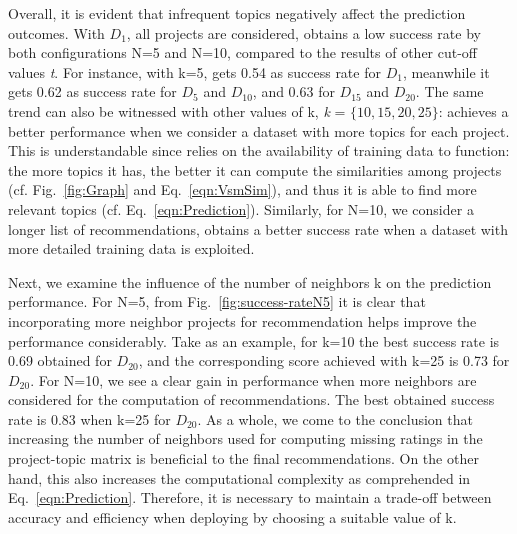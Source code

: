 Overall, it is evident that infrequent topics negatively affect the prediction outcomes. With $D_{1}$, \ie all projects are considered, \TF obtains a low success rate by both configurations N=5 and N=10, compared to the results of other cut-off values \emph{t}. For instance, with k=5, \TFa gets 0.54 as success rate for $D_{1}$, meanwhile it gets 0.62 as success rate for $D_{5}$ and $D_{10}$, and 0.63 for $D_{15}$ and $D_{20}$. The same trend can also be witnessed with other values of k, \ie \emph{k} = $\{10, 15, 20, 25\}$: \TFa achieves a better performance when we consider a dataset with more topics for each project. This is understandable since \TFa relies on the availability of training data to function: the more topics it has, the better it can compute the similarities among projects (cf. Fig.~\ref{fig:Graph} and Eq.~\ref{eqn:VsmSim}), and thus it is able to find more relevant topics (cf. Eq.~\ref{eqn:Prediction}). Similarly, for N=10, \ie we consider a longer list of recommendations, \TFa obtains a better success rate when a dataset with more detailed training data is exploited. 




Next, we examine the influence of the number of neighbors k on the prediction performance. For N=5, from Fig.~\ref{fig:success-rateN5} it is clear that incorporating more neighbor projects for recommendation helps improve the performance considerably. Take as an example, for k=10 the best success rate is 0.69 obtained for $D_{20}$, and the corresponding score achieved with k=25 is 0.73 for $D_{20}$. For N=10, we see a clear gain in performance when more neighbors are considered for the computation of recommendations. The best obtained success rate is 0.83 when k=25 for $D_{20}$. As a whole, we come to the conclusion that increasing the number of neighbors used for computing missing ratings in the project-topic matrix is beneficial to the final recommendations. On the other hand, this also increases the computational complexity as comprehended in Eq.~\ref{eqn:Prediction}. Therefore, it is necessary to maintain a trade-off between accuracy and efficiency when deploying \TF by choosing a suitable value of k. 



